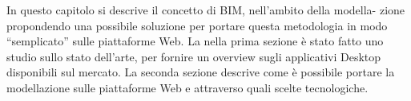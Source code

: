 In questo capitolo si descrive il concetto di BIM, nell’ambito della modella-
zione propondendo una possibile soluzione per portare questa metodologia in modo ``semplicato'' sulle piattaforme Web.
La nella prima sezione è stato fatto uno studio sullo stato dell’arte, per fornire un overview
sugli applicativi Desktop disponibili sul mercato. La seconda sezione descrive come è
possibile portare la modellazione sulle piattaforme Web e attraverso quali scelte tecnologiche.
